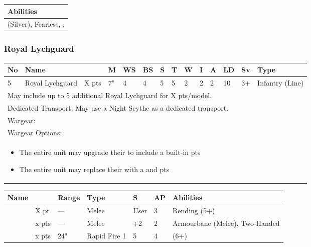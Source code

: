 \noindent
\begin{tabular}{||m{532pt}||}
	\hline
	Abilities \\
	\hline
	\quickref{Awakening Protocols} (Silver), Fearless, \quickref{Living Metal}, \quickref{Reanimation Protocols} \\
	\hline
\end{tabular}


\newpage
\subsubsection{Royal Lychguard}

\noindent
\begin{tabular}{||m{10pt} m{95pt} m{30pt} m{11pt} m{11pt} m{11pt} m{11pt} m{11pt} m{11pt} m{11pt} m{11pt} m{11pt} m{11pt} m{125pt}||}
	\hline
	No & Name & & M & WS & BS & S & T & W & I & A & LD & Sv & Type \\
	\hline
	5 & Royal Lychguard & X pts & 7" & 4 & 4 & 5 & 5 & 2 & 2 & 2 & 10 & 3+ & Infantry (Line)\\
	\hline
	\hline
	\multicolumn{14}{||Z{532 pt}||}{May include up to 5 additional Royal Lychguard for X pts/model.}\\	
	\multicolumn{14}{||Z{532 pt}||}{Dedicated Transport: May use a Night Scythe as a dedicated transport.}\\	
	\hline
	\hline
	\multicolumn{14}{||Z{532 pt}||}{Wargear: \quickref{Warscythe}}\\
	\multicolumn{14}{||Z{532 pt}||}{Wargear Options:} \\
	\multicolumn{14}{||Z{532 pt}||}{\begin{itemize}
			\item The entire unit may upgrade their \quickref{Warscythe} to include a built-in \quickref{Gauss Blaster} \hrulefill 5 pts
			\item The entire unit may replace their \quickref{Warscythe} with a \quickref{Hyperphase Sword} and \quickref{Dispersion Shield} \hrulefill 10 pts
	\end{itemize}} \\
	\hline
\end{tabular}

\noindent
\begin{tabular}{||m{110pt} m{30pt} m{31pt} m{55pt} m{12pt} m{12pt} m{210pt}||}
	\hline
	Name & & Range & Type & S & AP & Abilities \\
	\hline
	\quickref{Hyperphase Sword} & X pt & — & Melee & User & 3 & Rending (5+) \\
	\quickref{Warscythe} & x pts& — & Melee & +2 & 2 & Armourbane (Melee), Two-Handed \\
	\quickref{Gauss Blaster} & x pts& 24" & Rapid Fire 1 & 5 & 4 & \quickref{Gauss} (6+) \\
	\hline
\end{tabular}

